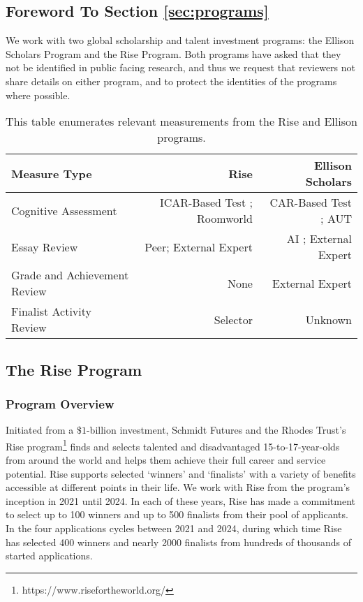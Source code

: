 \subsection{Foreword To Section \ref{sec:programs}}
We work with two global scholarship and talent investment programs: the Ellison Scholars Program and the Rise Program. Both programs have asked that they not be identified in public facing research, and thus we request that reviewers not share details on either program, and to protect the identities of the programs where possible.

\begin{table}[htbp]
    \centering
    \caption{This table enumerates relevant measurements from the Rise and Ellison programs.}
    \label{tab:measures}
    \begin{tabular}{l | r r}
        \toprule
        Measure Type & Rise & Ellison Scholars \\
        \midrule
        Cognitive Assessment & ICAR-Based Test \cite{condon2014international}; Roomworld \cite{summerfield} & CAR-Based Test \cite{condon2014international}; AUT \cite{guilford1967creativity,organisciak_beyond_2023} \\
        Essay Review & Peer; External Expert & AI \cite{xiao2024humanaicollaborativeessayscoring}; External Expert \\
        Grade and Achievement Review & None & External Expert \\
        Finalist Activity Review & Selector & Unknown \\
        \bottomrule
    \end{tabular}
  \end{table}
  
\subsection{The Rise Program}\label{ssec:rise}
\subsubsection{Program Overview}
Initiated from a $\$1$-billion investment, Schmidt Futures and the Rhodes Trust's Rise program\footnote{https://www.risefortheworld.org/} finds and selects talented and disadvantaged 15-to-17-year-olds from around the world and helps them achieve their full career and service potential. Rise supports selected `winners' and `finalists' with a variety of benefits accessible at different points in their life. We work with Rise from the program's inception in 2021 until 2024. In each of these years, Rise has made a commitment to select up to 100 winners and up to 500 finalists from their pool of applicants. In the four applications cycles between 2021 and 2024, during which time Rise has selected 400 winners and nearly 2000 finalists from hundreds of thousands of started applications.

